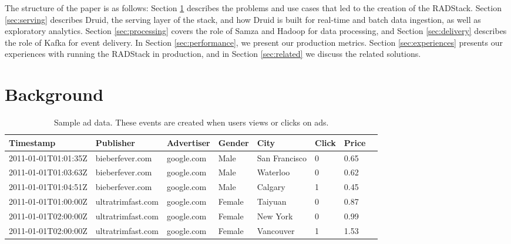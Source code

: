 \documentclass{vldb}
\begin{document}
The structure of the paper is as follows: Section \ref{sec:background}
describes the problems and use cases that led to the creation of the RADStack.
Section \ref{sec:serving} describes Druid, the serving layer of the stack, and
how Druid is built for real-time and batch data ingestion, as well as
exploratory analytics. Section \ref{sec:processing} covers the role of Samza
and Hadoop for data processing, and Section \ref{sec:delivery} describes the
role of Kafka for event delivery. In Section \ref{sec:performance}, we present
our production metrics.  Section \ref{sec:experiences} presents our experiences
with running the RADStack in production, and in Section \ref{sec:related} we
discuss the related solutions.

\section{Background}
\label{sec:background}

\begin{table}
\centering
\begin{tabular}{| l | l | l | l | l | l | l | l |}
  \hline
  \textbf{Timestamp} & \textbf{Publisher} & \textbf{Advertiser} & \textbf{Gender} & \textbf{City} & \textbf{Click} & \textbf{Price} \\ \hline
  2011-01-01T01:01:35Z & bieberfever.com & google.com & Male & San Francisco & 0 & 0.65 \\ \hline
  2011-01-01T01:03:63Z & bieberfever.com & google.com & Male & Waterloo & 0 & 0.62 \\ \hline
  2011-01-01T01:04:51Z & bieberfever.com & google.com & Male & Calgary & 1 & 0.45 \\ \hline
  2011-01-01T01:00:00Z & ultratrimfast.com & google.com & Female & Taiyuan & 0 & 0.87 \\ \hline
  2011-01-01T02:00:00Z & ultratrimfast.com & google.com & Female & New York & 0 & 0.99 \\ \hline
  2011-01-01T02:00:00Z & ultratrimfast.com & google.com & Female & Vancouver & 1 & 1.53 \\ \hline
\end{tabular}
\caption{Sample ad data. These events are created when users views or clicks on ads.}
\label{tab:sample_data}
\end{table}
\end{document}
